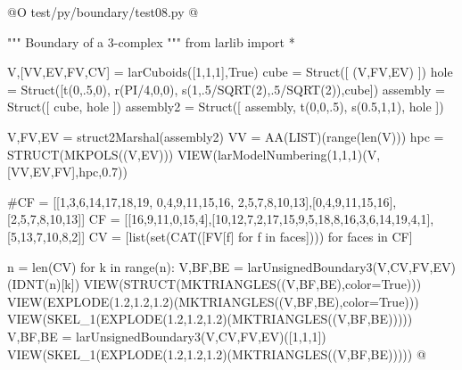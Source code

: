 \documentclass[11pt,oneside]{article}    %
\begin{document}
@O test/py/boundary/test08.py
@{""" Boundary of a 3-complex """
from larlib import *

V,[VV,EV,FV,CV] = larCuboids([1,1,1],True)
cube = Struct([ (V,FV,EV) ])
hole = Struct([t(0,.5,0), r(PI/4,0,0), s(1,.5/SQRT(2),.5/SQRT(2)),cube])
assembly = Struct([ cube, hole ])
assembly2 = Struct([ assembly, t(0,0,.5), s(0.5,1,1), hole ])

V,FV,EV = struct2Marshal(assembly2) 
VV = AA(LIST)(range(len(V)))
hpc = STRUCT(MKPOLS((V,EV)))
VIEW(larModelNumbering(1,1,1)(V,[VV,EV,FV],hpc,0.7))

#CF = [[1,3,6,14,17,18,19, 0,4,9,11,15,16, 2,5,7,8,10,13],[0,4,9,11,15,16],[2,5,7,8,10,13]]
CF = [[16,9,11,0,15,4],[10,12,7,2,17,15,9,5,18,8,16,3,6,14,19,4,1],[5,13,7,10,8,2]]
CV = [list(set(CAT([FV[f]  for f in faces]))) for faces in CF]

n = len(CV)
for k in range(n): 
    V,BF,BE = larUnsignedBoundary3(V,CV,FV,EV)(IDNT(n)[k])
    VIEW(STRUCT(MKTRIANGLES((V,BF,BE),color=True))) 
    VIEW(EXPLODE(1.2,1.2,1.2)(MKTRIANGLES((V,BF,BE),color=True))) 
    VIEW(SKEL_1(EXPLODE(1.2,1.2,1.2)(MKTRIANGLES((V,BF,BE)))))
V,BF,BE = larUnsignedBoundary3(V,CV,FV,EV)([1,1,1])
VIEW(SKEL_1(EXPLODE(1.2,1.2,1.2)(MKTRIANGLES((V,BF,BE)))))
@}
\end{document}
